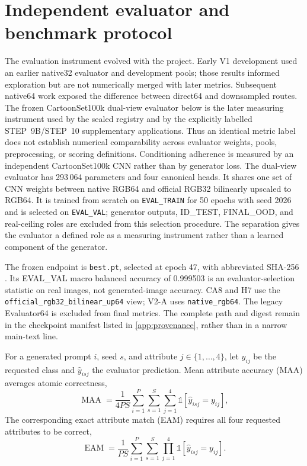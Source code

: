\section{Independent evaluator and benchmark protocol}\label{sec:evaluation}
The evaluation instrument evolved with the project. Early V1 development used an earlier native32 evaluator and development pools; those results informed exploration but are not numerically merged with later metrics. Subsequent native64 work exposed the difference between direct64 and downsampled routes. The frozen CartoonSet100k dual-view evaluator below is the later measuring instrument used by the sealed registry and by the explicitly labelled STEP~9B/STEP~10 supplementary applications. Thus an identical metric label does not establish numerical comparability across evaluator weights, pools, preprocessing, or scoring definitions.
Conditioning adherence is measured by an independent CartoonSet100k CNN rather than by generator loss. The dual-view evaluator has 293\,064 parameters and four canonical heads. It shares one set of CNN weights between native RGB64 and official RGB32 bilinearly upscaled to RGB64. It is trained from scratch on \texttt{EVAL\_TRAIN} for 50 epochs with seed 2026 and is selected on \texttt{EVAL\_VAL}; generator outputs, ID\_TEST, FINAL\_OOD, and real-ceiling roles are excluded from this selection procedure. The separation gives the evaluator a defined role as a measuring instrument rather than a learned component of the generator.

The frozen endpoint is \texttt{best.pt}, selected at epoch 47, with abbreviated SHA-256 . Its EVAL\_VAL macro balanced accuracy of 0.999503 is an evaluator-selection statistic on real images, not generated-image accuracy. CA8 and H7 use the \texttt{official\_rgb32\_bilinear\_up64} view; V2-A uses \texttt{native\_rgb64}. The legacy Evaluator64 is excluded from final metrics. The complete path and digest remain in the checkpoint manifest listed in \cref{app:provenance}, rather than in a narrow main-text line.

For a generated prompt $i$, seed $s$, and attribute $j\in\{1,\ldots,4\}$, let $y_{ij}$ be the requested class and $\hat y_{isj}$ the evaluator prediction. Mean attribute accuracy (MAA) averages atomic correctness,
\begin{equation}\label{eq:maa}
\operatorname{MAA}=\frac{1}{4PS}\sum_{i=1}^{P}\sum_{s=1}^{S}\sum_{j=1}^{4}\mathbb{1}[\hat y_{isj}=y_{ij}],
\end{equation}
The corresponding exact attribute match (EAM) requires all four requested attributes to be correct,
\begin{equation}\label{eq:eam}
\operatorname{EAM}=\frac{1}{PS}\sum_{i=1}^{P}\sum_{s=1}^{S}\prod_{j=1}^{4}\mathbb{1}[\hat y_{isj}=y_{ij}].
\end{equation}

